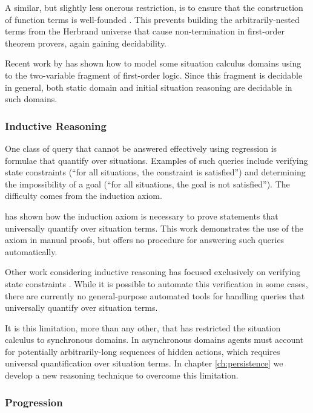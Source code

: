 A similar, but slightly less onerous restriction, is to ensure that
the construction of function terms is well-founded \citep{levesque04krr_book}.
This prevents building the arbitrarily-nested terms from the Herbrand
universe that cause non-termination in first-order theorem provers,
again gaining decidability.

Recent work by \citet{yu07twovar_sitcalc} has shown how to model
some situation calculus domains using to the two-variable fragment
of first-order logic. Since this fragment is decidable in general,
both static domain and initial situation reasoning are decidable in
such domains.


\subsubsection{Inductive Reasoning}

One class of query that cannot be answered effectively using regression
is formulae that quantify over situations. Examples of such queries
include verifying state constraints ({}``for all situations, the
constraint is satisfied'') and determining the impossibility of a
goal ({}``for all situations, the goal is not satisfied''). The
difficulty comes from the induction axiom.

\citet{Reiter93proving} has shown how the induction axiom is necessary
to prove statements that universally quantify over situation terms.
This work demonstrates the use of the axiom in manual proofs, but
offers no procedure for answering such queries automatically.

Other work considering inductive reasoning has focused exclusively
on verifying state constraints \citep{Lin94-StateConstraints,bertossi96automating}.
While it is possible to automate this verification in some cases,
there are currently no general-purpose automated tools for handling
queries that universally quantify over situation terms.

It is this limitation, more than any other, that has restricted the
situation calculus to synchronous domains. In asynchronous domains
agents must account for potentially arbitrarily-long sequences of
hidden actions, which requires universal quantification over situation
terms. In chapter \ref{ch:persistence} we develop a new reasoning
technique to overcome this limitation.


\subsubsection{Progression\label{sec:Background:Progression}}

